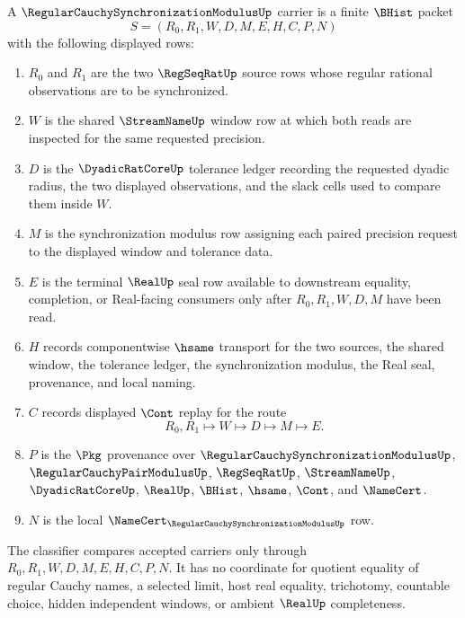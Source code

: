 \begin{definition}
\label{def:regular-cauchy-synchronization-modulus-carrier}
A $\RegularCauchySynchronizationModulusUp$ carrier is a finite $\BHist$ packet
$$
S=(R_0,R_1,W,D,M,E,H,C,P,N)
$$
with the following displayed rows:
\begin{enumerate}
\item $R_0$ and $R_1$ are the two $\RegSeqRatUp$ source rows whose regular rational observations are to be synchronized.
\item $W$ is the shared $\StreamNameUp$ window row at which both reads are inspected for the same requested precision.
\item $D$ is the $\DyadicRatCoreUp$ tolerance ledger recording the requested dyadic radius, the two displayed observations, and the slack cells used to compare them inside $W$.
\item $M$ is the synchronization modulus row assigning each paired precision request to the displayed window and tolerance data.
\item $E$ is the terminal $\RealUp$ seal row available to downstream equality, completion, or Real-facing consumers only after $R_0,R_1,W,D,M$ have been read.
\item $H$ records componentwise $\hsame$ transport for the two sources, the shared window, the tolerance ledger, the synchronization modulus, the Real seal, provenance, and local naming.
\item $C$ records displayed $\Cont$ replay for the route
$$
R_0,R_1 \longmapsto W \longmapsto D \longmapsto M \longmapsto E .
$$
\item $P$ is the $\Pkg$ provenance over $\RegularCauchySynchronizationModulusUp$, $\RegularCauchyPairModulusUp$, $\RegSeqRatUp$, $\StreamNameUp$, $\DyadicRatCoreUp$, $\RealUp$, $\BHist$, $\hsame$, $\Cont$, and $\NameCert$.
\item $N$ is the local $\NameCert_{\RegularCauchySynchronizationModulusUp}$ row.
\end{enumerate}
The classifier compares accepted carriers only through $R_0,R_1,W,D,M,E,H,C,P,N$. It has no coordinate for quotient equality of regular Cauchy names, a selected limit, host real equality, trichotomy, countable choice, hidden independent windows, or ambient $\RealUp$ completeness.
\end{definition}

